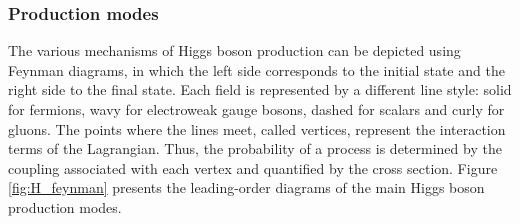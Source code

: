 \subsubsection{Production modes}
%
The various mechanisms of Higgs boson production can be depicted using Feynman diagrams, in which the left side corresponds to the initial state and the right side to the final state. Each field is represented by a different line style: solid for fermions, wavy for electroweak gauge bosons, dashed for scalars and curly for gluons. The points where the lines meet, called vertices, represent the interaction terms of the Lagrangian. Thus, the probability of a process is determined by the coupling associated with each vertex and quantified by the cross section. Figure \ref{fig:H_feynman} presents the leading-order diagrams of the main Higgs boson production modes.
%
